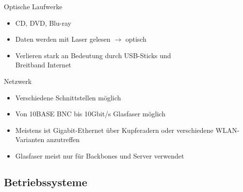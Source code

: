 \documentclass[aspectratio=43]{beamer}
\begin{document}
\begin{frame} 

	\begin{block}{Optische Laufwerke} 
	\begin{itemize}
	\item CD, DVD, Blu-ray
	\item Daten werden mit Laser gelesen $\rightarrow$ optisch
	\item Verlieren stark an Bedeutung durch USB-Sticks und \\Breitband Internet
	\end{itemize}
	\end{block}

	\begin{block}{Netzwerk} 
	\begin{itemize}
	\item Verschiedene Schnittstellen möglich
	\item Von 10BASE BNC bis 10Gbit/s Glasfaser möglich
	\item Meistens ist Gigabit-Ethernet über Kupferadern oder verschiedene WLAN-Varianten anzutreffen
	\item Glasfaser meist nur für Backbones und Server verwendet
	\end{itemize}
	\end{block}
\end{frame}

\subsection{Betriebssysteme}

\end{document}
